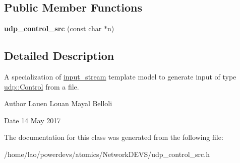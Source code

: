 \subsection*{Public Member Functions}
\begin{DoxyCompactItemize}
\item 
{\bfseries udp\+\_\+control\+\_\+src} (const char $\ast$n)\hypertarget{classudp__control__src_a40abd75549f525a16f006a54a9ffb87b}{}\label{classudp__control__src_a40abd75549f525a16f006a54a9ffb87b}

\end{DoxyCompactItemize}


\subsection{Detailed Description}
A specialization of \hyperlink{classinput__stream}{input\+\_\+stream} template model to generate input of type \hyperlink{structudp_1_1Control}{udp\+::\+Control} from a file. 

\begin{DoxyAuthor}{Author}
Lauen Louan Mayal Belloli 
\end{DoxyAuthor}
\begin{DoxyDate}{Date}
14 May 2017 
\end{DoxyDate}


The documentation for this class was generated from the following file\+:\begin{DoxyCompactItemize}
\item 
/home/lao/powerdevs/atomics/\+Network\+D\+E\+V\+S/udp\+\_\+control\+\_\+src.\+h\end{DoxyCompactItemize}
